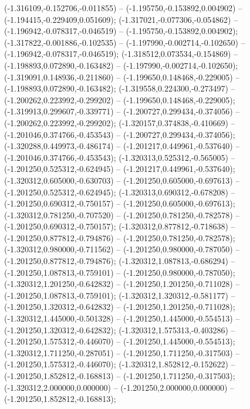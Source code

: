 (-1.316109,-0.152706,-0.011855) -- (-1.195750,-0.153892,0.004902) -- (-1.194415,-0.229409,0.051609);
 (-1.317021,-0.077306,-0.054862) -- (-1.196942,-0.078317,-0.046519) -- (-1.195750,-0.153892,0.004902);
 (-1.317822,-0.001886,-0.102535) -- (-1.197990,-0.002714,-0.102650) -- (-1.196942,-0.078317,-0.046519);
 (-1.318512,0.073534,-0.154869) -- (-1.198893,0.072890,-0.163482) -- (-1.197990,-0.002714,-0.102650);
 (-1.319091,0.148936,-0.211860) -- (-1.199650,0.148468,-0.229005) -- (-1.198893,0.072890,-0.163482);
 (-1.319558,0.224300,-0.273497) -- (-1.200262,0.223992,-0.299202) -- (-1.199650,0.148468,-0.229005);
 (-1.319913,0.299607,-0.339771) -- (-1.200727,0.299434,-0.374056) -- (-1.200262,0.223992,-0.299202);
 (-1.320157,0.374838,-0.410669) -- (-1.201046,0.374766,-0.453543) -- (-1.200727,0.299434,-0.374056);
 (-1.320288,0.449973,-0.486174) -- (-1.201217,0.449961,-0.537640) -- (-1.201046,0.374766,-0.453543);
 (-1.320313,0.525312,-0.565005) -- (-1.201250,0.525312,-0.624945) -- (-1.201217,0.449961,-0.537640);
 (-1.320312,0.605000,-0.630703) -- (-1.201250,0.605000,-0.697613) -- (-1.201250,0.525312,-0.624945);
 (-1.320313,0.690312,-0.678208) -- (-1.201250,0.690312,-0.750157) -- (-1.201250,0.605000,-0.697613);
 (-1.320312,0.781250,-0.707520) -- (-1.201250,0.781250,-0.782578) -- (-1.201250,0.690312,-0.750157);
 (-1.320312,0.877812,-0.718638) -- (-1.201250,0.877812,-0.794876) -- (-1.201250,0.781250,-0.782578);
 (-1.320312,0.980000,-0.711562) -- (-1.201250,0.980000,-0.787050) -- (-1.201250,0.877812,-0.794876);
 (-1.320312,1.087813,-0.686294) -- (-1.201250,1.087813,-0.759101) -- (-1.201250,0.980000,-0.787050);
 (-1.320312,1.201250,-0.642832) -- (-1.201250,1.201250,-0.711028) -- (-1.201250,1.087813,-0.759101);
 (-1.320312,1.320312,-0.581177) -- (-1.201250,1.320312,-0.642832) -- (-1.201250,1.201250,-0.711028);
 (-1.320312,1.445000,-0.501328) -- (-1.201250,1.445000,-0.554513) -- (-1.201250,1.320312,-0.642832);
 (-1.320312,1.575313,-0.403286) -- (-1.201250,1.575312,-0.446070) -- (-1.201250,1.445000,-0.554513);
 (-1.320312,1.711250,-0.287051) -- (-1.201250,1.711250,-0.317503) -- (-1.201250,1.575312,-0.446070);
 (-1.320312,1.852812,-0.152622) -- (-1.201250,1.852812,-0.168813) -- (-1.201250,1.711250,-0.317503);
 (-1.320312,2.000000,0.000000) -- (-1.201250,2.000000,0.000000) -- (-1.201250,1.852812,-0.168813);
